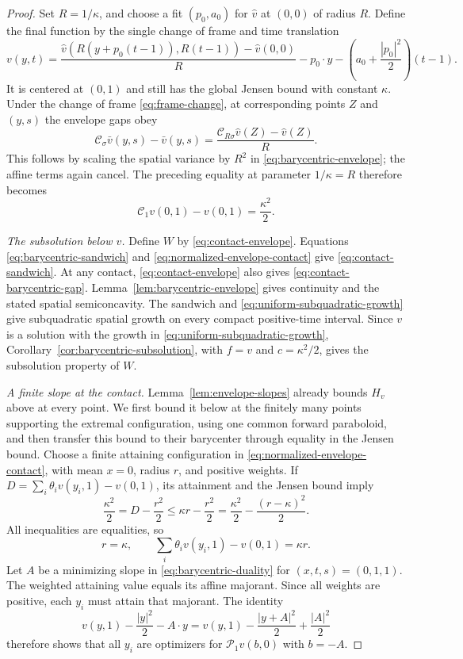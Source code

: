 \documentclass[11pt]{article}
\numberwithin{equation}{section}
\theoremstyle{definition}
\theoremstyle{remark}
\newcommand{\Penv}{\mathcal{P}}
\newcommand{\Cenv}{\mathcal{C}}
\begin{document}
\begin{proof}
Set $R=1/\kappa$, and choose a fit $(p_0,a_0)$ for
$\widehat v$ at $(0,0)$ of radius $R$. Define the final function
by the single change of frame and time translation
\[
  v(y,t)=
   \frac{\widehat v(R(y+p_0(t-1)),R(t-1))-\widehat v(0,0)}{R}
       -p_0\cdot y
       -\left(a_0+\frac{|p_0|^2}{2}\right)(t-1).
\]
It is centered at $(0,1)$ and still has the global Jensen bound
with constant $\kappa$. Under the change of frame
\eqref{eq:frame-change}, at corresponding points $Z$ and
$(y,s)$ the envelope gaps obey
\[
  \Cenv_\sigma\bar v(y,s)-\bar v(y,s)
     =\frac{\Cenv_{R\sigma}\widehat v(Z)-\widehat v(Z)}{R}.
\]
This follows by scaling the spatial variance by $R^2$ in
\eqref{eq:barycentric-envelope}; the affine terms again
cancel. The preceding equality at parameter $1/\kappa=R$
therefore becomes
\begin{equation}\label{eq:normalized-envelope-contact}
  \Cenv_1v(0,1)-v(0,1)=\frac{\kappa^2}{2}.
\end{equation}

\emph{The subsolution below $v$.}
Define $W$ by \eqref{eq:contact-envelope}.
Equations \eqref{eq:barycentric-sandwich} and
\eqref{eq:normalized-envelope-contact} give
\eqref{eq:contact-sandwich}. At any contact, \eqref{eq:contact-envelope}
also gives \eqref{eq:contact-barycentric-gap}.
Lemma~\ref{lem:barycentric-envelope}
gives continuity and the stated spatial semiconcavity. The
sandwich and \eqref{eq:uniform-subquadratic-growth} give
subquadratic spatial growth on every compact positive-time
interval.
Since $v$ is a solution with the growth in
\eqref{eq:uniform-subquadratic-growth},
Corollary~\ref{cor:barycentric-subsolution}, with $f=v$ and
$c=\kappa^2/2$, gives the subsolution property of $W$.

\emph{A finite slope at the contact.}
Lemma~\ref{lem:envelope-slopes} already bounds $H_v$ above at every point.
We first bound it below at the finitely many points supporting the extremal
configuration, using one common forward paraboloid, and then transfer this
bound to their barycenter through equality in the Jensen bound.
Choose a finite attaining configuration in
\eqref{eq:normalized-envelope-contact}, with mean $x=0$,
radius $r$, and positive weights. If
$D=\sum_i\theta_i v(y_i,1)-v(0,1)$, its attainment and the
Jensen bound imply
\[
  \frac{\kappa^2}{2}=D-\frac{r^2}{2}
       \le\kappa r-\frac{r^2}{2}
       =\frac{\kappa^2}{2}-\frac{(r-\kappa)^2}{2}.
\]
All inequalities are equalities, so
\begin{equation}\label{eq:contact-configuration}
  r=\kappa,\qquad
  \sum_i\theta_i v(y_i,1)-v(0,1)=\kappa r.
\end{equation}
Let $A$ be a minimizing slope in
\eqref{eq:barycentric-duality} for $(x,t,s)=(0,1,1)$.
The weighted attaining value equals its affine majorant.
Since all weights are positive, each $y_i$ must attain that
majorant. The identity
\[
  v(y,1)-\frac{|y|^2}{2}-A\cdot y
   =v(y,1)-\frac{|y+A|^2}{2}+\frac{|A|^2}{2}
\]
therefore shows that all $y_i$ are optimizers for $\Penv_1v(b,0)$ with
$b=-A$.


\end{proof}
\end{document}
